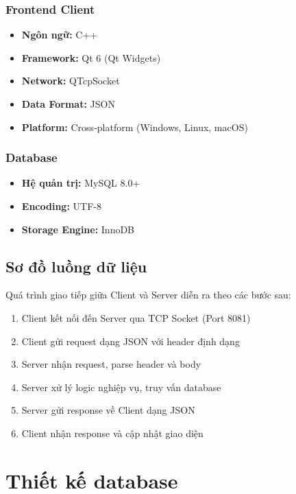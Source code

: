 \documentclass[12pt,a4paper]{report}
\begin{document}
\subsubsection{Frontend Client}
\begin{itemize}
    \item \textbf{Ngôn ngữ:} C++
    \item \textbf{Framework:} Qt 6 (Qt Widgets)
    \item \textbf{Network:} QTcpSocket
    \item \textbf{Data Format:} JSON
    \item \textbf{Platform:} Cross-platform (Windows, Linux, macOS)
\end{itemize}

\subsubsection{Database}
\begin{itemize}
    \item \textbf{Hệ quản trị:} MySQL 8.0+
    \item \textbf{Encoding:} UTF-8
    \item \textbf{Storage Engine:} InnoDB
\end{itemize}

\subsection{Sơ đồ luồng dữ liệu}

Quá trình giao tiếp giữa Client và Server diễn ra theo các bước sau:

\begin{enumerate}
    \item Client kết nối đến Server qua TCP Socket (Port 8081)
    \item Client gửi request dạng JSON với header định dạng
    \item Server nhận request, parse header và body
    \item Server xử lý logic nghiệp vụ, truy vấn database
    \item Server gửi response về Client dạng JSON
    \item Client nhận response và cập nhật giao diện
\end{enumerate}

\section{Thiết kế database}
\end{document}
